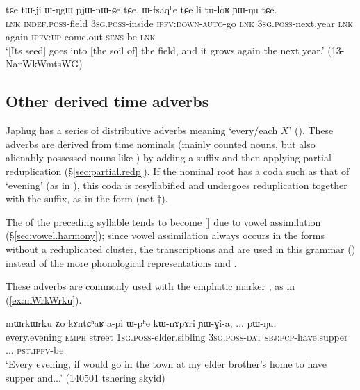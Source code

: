 \begin{exe}
\ex \label{ex:Wfsqaqhe}
\gll   tɕe tɯ-ji ɯ-ŋgɯ pjɯ-nɯ-ɕe tɕe, ɯ-fsaqʰe tɕe li tu-ɬoʁ ɲɯ-ŋu tɕe.   \\
 \textsc{lnk} \textsc{indef}.\textsc{poss}-field \textsc{3sg}.\textsc{poss}-inside \textsc{ipfv}:\textsc{down}-\textsc{auto}-go  \textsc{lnk} \textsc{3sg}.\textsc{poss}-next.year \textsc{lnk} again \textsc{ipfv}:\textsc{up}-come.out \textsc{sens}-be \textsc{lnk}  \\
\glt `[Its seed] goes into [the soil of] the field, and it grows again the next year.' (13-NanWkWmtsWG)
\end{exe}

 \subsection{Other derived time adverbs} \label{sec:time.adv}
Japhug has a series of distributive adverbs meaning `every/each $X$' (). These adverbs are derived from time nominals (mainly counted nouns, but also alienably possessed nouns like ) by adding a suffix  and then applying partial reduplication (§\ref{sec:partial.redp}). If the nominal root has a coda such as that of  `evening' (as in ), this coda is resyllabified and undergoes reduplication together with the suffix, as in the form  (not $\dagger$). 

The  of the preceding syllable tends to become [] due to vowel assimilation (§\ref{sec:vowel.harmony}); since vowel assimilation always occurs in the forms without a reduplicated cluster, the transcriptions   and    are used in this grammar () instead of the more phonological representations  and .

These adverbs are commonly used with the emphatic marker , as in (\ref{ex:mWrkWrku}).


\begin{exe}
\ex \label{ex:mWrkWrku}
\gll  mɯrkɯrku ʑo kɤntɕʰaʁ a-pi ɯ-pʰe kɯ-nɤpɤri ɲɯ-ɣi-a, ... pɯ-ŋu. \\
every.evening \textsc{emph} {street} \textsc{1sg}.\textsc{poss}-elder.sibling \textsc{3sg}.\textsc{poss}-\textsc{dat} \textsc{sbj}:\textsc{pcp}-have.supper ... \textsc{pst}.\textsc{ipfv}-be \\
\glt `Every evening, if would go in the town at my elder brother's home to have supper and...' (140501 tshering skyid)
\end{exe}

